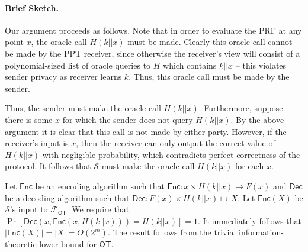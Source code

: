 \documentclass[10pt,a4paper]{article}
\newcommand{\F}{\mathcal{F}}
\newcommand{\sender}{\mathcal{S}}
\newcommand{\ot}{\mathsf{OT}}
\newcommand{\Enc}{\mathsf{Enc}}
\begin{document}
\paragraph{Brief Sketch.} Our argument proceeds as follows. Note that in order to evaluate the PRF at any point $x$, the oracle call $H(k||x)$ must be made. Clearly this oracle call cannot be made by the PPT receiver, since otherwise the receiver's view will consist of a polynomial-sized list of oracle queries to $H$ which contains $k||x$ -- this violates sender privacy as receiver learns $k$. Thus, this oracle call must be made by the sender.

Thus, the sender must make the oracle call $H(k||x)$. Furthermore, suppose there is some $x$ for which the sender does not query $H(k||x)$. By the above argument it is clear that this call is not made by either party. However, if the receiver's input is $x$, then the receiver can only output the correct value of $H(k||x)$ with negligible probability, which contradicts perfect correctness of the protocol. It follows that $\sender$ must make the oracle call $H(k||x)$ for each $x$.

Let $\mathsf{Enc}$ be an encoding algorithm such that $\Enc:x\times H(k||x)\mapsto F(x)$ and $\mathsf{Dec}$ be a decoding algorithm such that $\mathsf{Dec}:F(x)\times H(k||x)\mapsto X$. Let $\Enc(X)$ be $\sender$'s input to $\F_\ot$. We require that $\Pr[\mathsf{Dec}(x, \Enc(x, H(k||x))) = H(k||x)]=1$. It immediately follows that $|\Enc(X)| = |X| = O(2^m)$. The result follows from the trivial information-theoretic lower bound for $\ot$.


%	
%	
	
\end{document}
